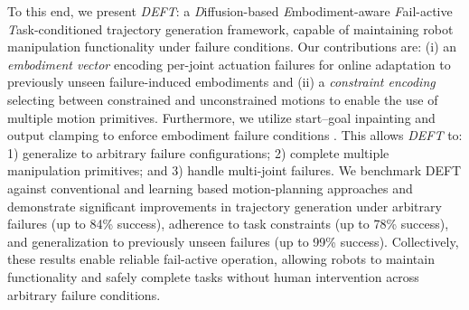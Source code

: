 To this end, we present \textit{DEFT}: a \textit{D}iffusion-based \textit{E}mbodiment-aware \textit{F}ail-active \textit{T}ask-conditioned trajectory generation framework, capable of maintaining robot manipulation functionality under failure conditions. Our contributions are:
(i) an \textit{embodiment vector} encoding per-joint actuation failures for online adaptation to previously unseen failure-induced embodiments and
(ii) a \textit{constraint encoding} selecting between constrained and unconstrained motions to enable the use of multiple motion primitives.
Furthermore, we utilize start–goal inpainting and output clamping to enforce embodiment failure conditions \cite{repaint_lugmayr_2022}.
This allows \textsl{DEFT} to: 1) generalize to arbitrary failure configurations; 2) complete multiple manipulation primitives; and 3) handle multi-joint failures.
We benchmark DEFT against conventional and learning based motion-planning approaches and demonstrate significant improvements in trajectory generation under arbitrary failures (up to 84\% success), adherence to task constraints (up to 78\% success), and generalization to previously unseen failures (up to 99\% success). Collectively, these results enable reliable fail-active operation, allowing robots to maintain functionality and safely complete tasks without human intervention across arbitrary failure conditions.

